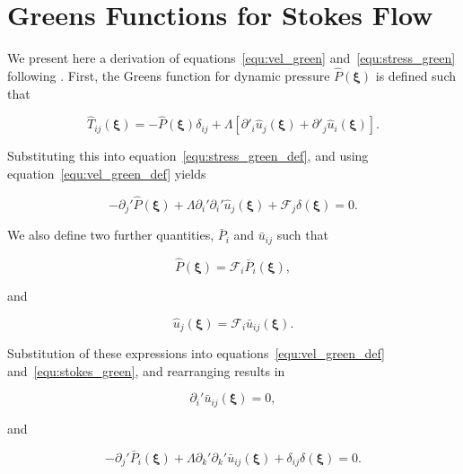 \documentclass[12pt]{article}
\begin{document}
\section{Greens Functions for Stokes Flow}
\label{app:Greens}

We present here a derivation of equations~\ref{equ:vel_green} and~\ref{equ:stress_green} following \citet{Ladyzhenskaya63}. First, the Greens function for dynamic pressure $\hat{P}(\boldsymbol{\xi})$ is defined such that

\begin{equation}
\label{equ:press_green_def}
\hat{T}_{ij}(\boldsymbol{\xi}) = - \hat{P}(\boldsymbol{\xi}) \delta_{ij} + \Lambda[\partial'_{i} \hat{u}_{j}(\boldsymbol{\xi}) + \partial'_{j} \hat{u}_{i}(\boldsymbol{\xi})] .
\end{equation}


Substituting this into equation~\ref{equ:stress_green_def}, and using equation~\ref{equ:vel_green_def} yields 

\begin{equation}
\label{equ:stokes_green}
-\partial_{j}' \hat{P}(\boldsymbol{\xi}) + \Lambda \partial_{i}' \partial_{i}' \hat{u}_{j}(\boldsymbol{\xi}) + \mathcal{F}_{j} \delta(\boldsymbol{\xi}) = 0 .
\end{equation}


We also define two further quantities, $\bar{P}_{i}$ and $\bar{u}_{ij}$ such that

\begin{equation}
\label{equ:pres_bar}
\hat{P} (\boldsymbol{\xi}) = \mathcal{F}_{i} \bar{P}_{i} (\boldsymbol{\xi}) ,
\end{equation}

and 

\begin{equation}
\label{equ:vel_bar}
\hat{u}_{j}(\boldsymbol{\xi}) = \mathcal{F}_{i} \bar{u}_{ij} (\boldsymbol{\xi}) .
\end{equation}

Substitution of these expressions into equations~\ref{equ:vel_green_def} and~\ref{equ:stokes_green}, and rearranging results in

\begin{equation}
\label{equ:cont_bar}
\partial_{i}' \bar{u}_{ij} (\boldsymbol\xi)  = 0 ,
\end{equation}

and

\begin{equation}
\label{equ:stokes_bar}
-\partial_{j}' \bar{P}_{i} (\boldsymbol\xi) + \Lambda \partial_{k}' \partial_{k}' \bar{u}_{ij} (\boldsymbol\xi) + \delta_{ij} \delta(\boldsymbol\xi) = 0 .
\end{equation}
\end{document}
